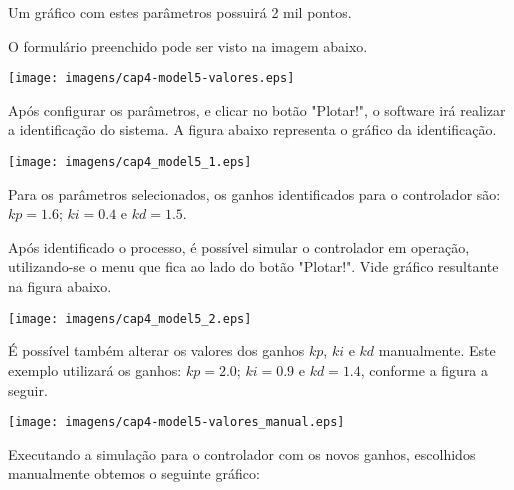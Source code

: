         Um gráfico com estes parâmetros possuirá 2 mil pontos.
        
        O formulário preenchido pode ser visto na imagem abaixo.
        
        \begin{center}
            \texttt{[image: imagens/cap4-model5-valores.eps]}
        \end{center}
        
        Após configurar os parâmetros, e clicar no botão "Plotar!", o software
        irá realizar a identificação do sistema. A figura abaixo representa o
        gráfico da identificação.
        
        \begin{center}
            \texttt{[image: imagens/cap4\_model5\_1.eps]}
        \end{center}
        
        Para os parâmetros selecionados, os ganhos identificados para o
        controlador são: $kp=1.6$; $ki=0.4$ e $kd=1.5$.
        
        Após identificado o processo, é possível simular o controlador em
        operação, utilizando-se o menu que fica ao lado do botão "Plotar!".
        Vide gráfico resultante na figura abaixo.

        \begin{center}
            \texttt{[image: imagens/cap4\_model5\_2.eps]}
        \end{center}
        
        É possível também alterar os valores dos ganhos $kp$, $ki$ e $kd$ manualmente.
        Este exemplo utilizará os ganhos: $kp=2.0$; $ki=0.9$ e $kd=1.4$,
        conforme a figura a seguir.
        
        \begin{center}
            \texttt{[image: imagens/cap4-model5-valores\_manual.eps]}
        \end{center}
        
        Executando a simulação para o controlador com os novos ganhos, escolhidos manualmente
        obtemos o seguinte gráfico:
        
